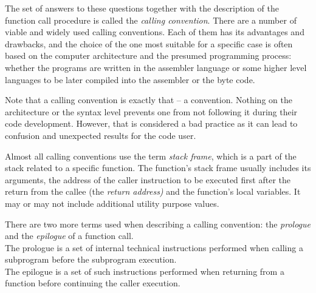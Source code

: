The set of answers to these questions together with the description
of the function call procedure is called the \textit{calling convention}.
There are a number of viable and widely used calling conventions.
Each of them has its advantages and drawbacks, and the choice of the one most
suitable for a specific case is often based on the computer architecture
and the presumed programming process: whether the programs are written
in the assembler language or some higher level languages to be later
compiled into the assembler or the byte code.

Note that a calling convention is exactly that -- a convention.
Nothing on the architecture or the syntax level prevents one from not following
it during their code development.
However, that is considered a bad practice as it can lead to confusion and
unexpected results for the code user.

Almost all calling conventions use the term \textit{stack frame}, which
is a part of the stack related to a specific function.
The function's stack frame usually includes its arguments, the address
of the caller instruction to be executed first after the return from
the callee (the \textit{return address)} and the function's local variables.
It may or may not include additional utility purpose values.

There are two more terms used when describing a calling convention:
the \textit{prologue} and the \textit{epilogue} of a function call. \\
The prologue is a set of internal technical instructions performed
when calling a subprogram before the subprogram execution. \\
The epilogue is a set of such instructions performed
when returning from a function before continuing the caller execution.
